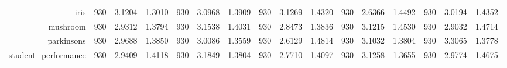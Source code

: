 \begin{table}[htbp]
{\begin{tabular}{rccccccccccccccc}
                  iris                                & 930                                     & 3.1204                                                                    & 1.3010          & 930                            & 3.0968                                                                    & 1.3909          & 930                             & 3.1269                                                                             & 1.4320          & 930                             & \cellcolor[rgb]{ .776,  .937,  .808}\textcolor[rgb]{ 0,  .38,  0}{2.6366} & 1.4492          & 930                             & 3.0194                                                                    & 1.4352          \\
                  mushroom                            & 930                                     & 2.9312                                                                    & 1.3794          & 930                            & 3.1538                                                                    & 1.4031          & 930                             & \cellcolor[rgb]{ .776,  .937,  .808}\textcolor[rgb]{ 0,  .38,  0}{2.8473}          & 1.3836          & 930                             & 3.1215                                                                    & 1.4530          & 930                             & 2.9032                                                                    & 1.4714          \\
                  parkinsons                          & 930                                     & 2.9688                                                                    & 1.3850          & 930                            & 3.0086                                                                    & 1.3559          & 930                             & \cellcolor[rgb]{ .776,  .937,  .808}\textcolor[rgb]{ 0,  .38,  0}{2.6129}          & 1.4814          & 930                             & 3.1032                                                                    & 1.3804          & 930                             & 3.3065                                                                    & 1.3778          \\
                  student\_performance                & 930                                     & 2.9409                                                                    & 1.4118          & 930                            & 3.1849                                                                    & 1.3804          & 930                             & \cellcolor[rgb]{ .776,  .937,  .808}\textcolor[rgb]{ 0,  .38,  0}{2.7710}          & 1.4097          & 930                             & 3.1258                                                                    & 1.3655          & 930                             & 2.9774                                                                    & 1.4675          \\

\end{tabular}}
\end{table}
